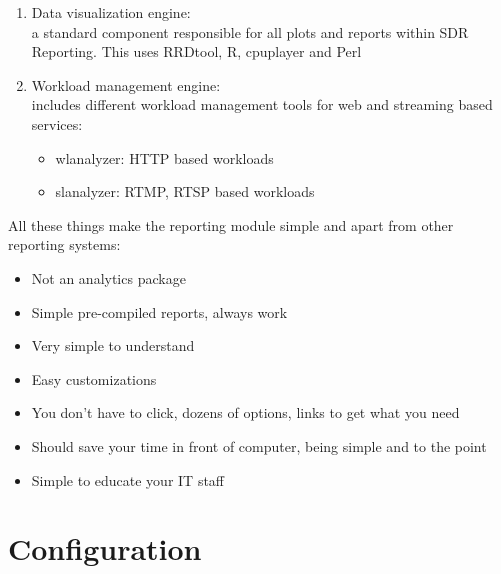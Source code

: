 \begin{enumerate}

\item Data visualization engine:\\
a standard component responsible for all plots and reports within SDR Reporting. 
This uses RRDtool, R, cpuplayer and Perl

\item Workload management engine:\\
includes different workload management tools for web and streaming based 
services: 
\begin{itemize}
 \item wlanalyzer: HTTP based workloads
 \item slanalyzer: RTMP, RTSP based workloads
\end{itemize}

\end{enumerate}

All these things make the reporting module simple and apart from other 
reporting systems:

\begin{itemize}
\item Not an analytics package
\item Simple pre-compiled reports, always work
\item Very simple to understand
\item Easy customizations
\item You don't have to click, dozens of options, links to get what you need
\item Should save your time in front of computer, being simple and to the point
\item Simple to educate your IT staff
\end{itemize}

\section{Configuration}


\endinput
